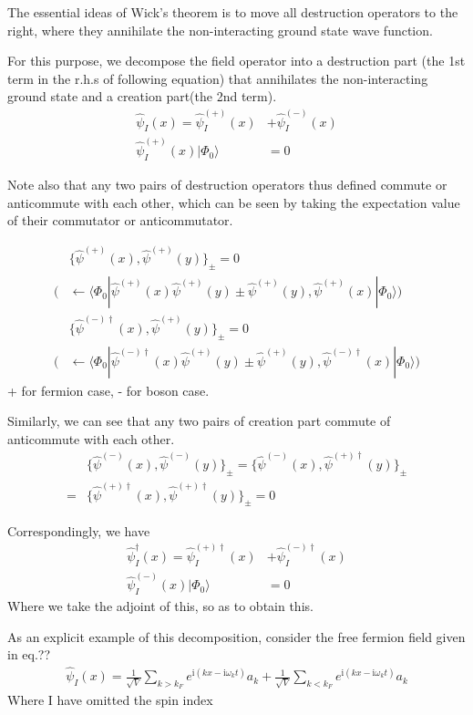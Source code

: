 The essential ideas of Wick's theorem is to move all destruction operators to the right, where they annihilate the non-interacting ground state wave function.

For this purpose, we decompose the field operator into a destruction part (the 1st term in the r.h.s of following equation) that annihilates the non-interacting ground state and a creation part(the 2nd term).
\begin{align}
\hat \psi_{I}(x)=\hat \psi^{(+)}_{I}(x)&+\hat \psi^{(-)}_{I}(x) \nonumber \\
\hat \psi^{(+)}_{I}(x)|\Phi_0\rangle&=0 \nonumber
\end{align}

Note also that any two pairs of destruction operators thus defined commute or anticommute with each other, which can be seen by taking the expectation value of their commutator or anticommutator.

\begin{align}
&\{\hat \psi^{(+)}(x),\hat \psi^{(+)}(y)\}_{\pm}=0 \nonumber \\
\big (&\leftarrow\langle\Phi_0|\hat \psi^{(+)}(x)\hat \psi^{(+)}(y)\pm\hat \psi^{(+)}(y),\hat \psi^{(+)}(x)|\Phi_0\rangle \big) \nonumber \\
&\{\hat \psi^{(-)\dagger}(x),\hat \psi^{(+)}(y)\}_{\pm}=0 \nonumber \\
\big (&\leftarrow\langle\Phi_0|\hat \psi^{(-)\dagger}(x)\hat \psi^{(+)}(y)\pm\hat \psi^{(+)}(y),\hat \psi^{(-)\dagger}(x)|\Phi_0\rangle \big) \nonumber
\end{align} 
+ for fermion case, - for boson case.

Similarly, we can see that any two pairs of creation part commute of anticommute with each other.
\begin{align}
&\{\hat \psi^{(-)}(x),\hat \psi^{(-)}(y)\}_{\pm}=\{\hat \psi^{(-)}(x),\hat \psi^{(+)\dagger}(y)\}_{\pm} \nonumber \\
=&\{\hat \psi^{(+)\dagger}(x),\hat \psi^{(+)\dagger}(y)\}_{\pm}=0 \nonumber 
\end{align}

Correspondingly, we have
\begin{align}
\hat \psi^{\dagger}_{I}(x)=\hat \psi^{(+)\dagger}_{I}(x)&+\hat \psi^{(-)\dagger}_{I}(x) \nonumber \\
\hat \psi^{(-)}_{I}(x)|\Phi_0\rangle&=0 \nonumber
\end{align}
Where we take the adjoint of this, so as to obtain this.

As an explicit example of this decomposition, consider the free fermion field given in eq.??
\begin{align}
\hat \psi_I(x)=\frac{1}{\sqrt{V}}\sum_{k>k_F} e^{\mathrm{i}(kx-\mathrm{i}\omega_kt)}a_k+\frac{1}{\sqrt{V}}\sum_{k<k_F} e^{\mathrm{i}(kx-\mathrm{i}\omega_kt)}a_k \nonumber
\end{align}
Where I have omitted the spin index


